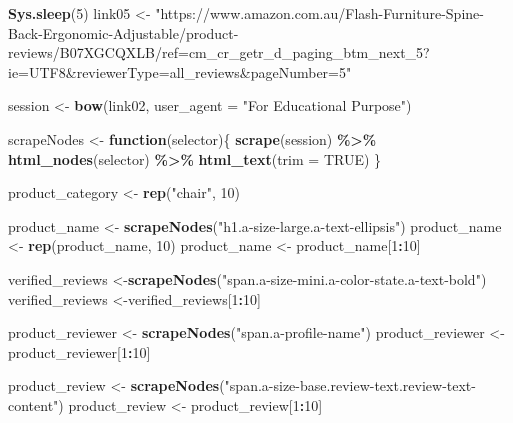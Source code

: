 \documentclass[
]{article}
\newenvironment{Shaded}{\begin{snugshade}}{\end{snugshade}}
\newcommand{\AttributeTok}[1]{\textcolor[rgb]{0.13,0.29,0.53}{#1}}
\newcommand{\ConstantTok}[1]{\textcolor[rgb]{0.56,0.35,0.01}{#1}}
\newcommand{\ControlFlowTok}[1]{\textcolor[rgb]{0.13,0.29,0.53}{\textbf{#1}}}
\newcommand{\DecValTok}[1]{\textcolor[rgb]{0.00,0.00,0.81}{#1}}
\newcommand{\FunctionTok}[1]{\textcolor[rgb]{0.13,0.29,0.53}{\textbf{#1}}}
\newcommand{\NormalTok}[1]{#1}
\newcommand{\OtherTok}[1]{\textcolor[rgb]{0.56,0.35,0.01}{#1}}
\newcommand{\SpecialCharTok}[1]{\textcolor[rgb]{0.81,0.36,0.00}{\textbf{#1}}}
\newcommand{\StringTok}[1]{\textcolor[rgb]{0.31,0.60,0.02}{#1}}
\begin{document}
\begin{Shaded}
\begin{Highlighting}[]
   \FunctionTok{Sys.sleep}\NormalTok{(}\DecValTok{5}\NormalTok{)}
\NormalTok{link05 }\OtherTok{\textless{}{-}} \StringTok{"https://www.amazon.com.au/Flash{-}Furniture{-}Spine{-}Back{-}Ergonomic{-}Adjustable/product{-}reviews/B07XGCQXLB/ref=cm\_cr\_getr\_d\_paging\_btm\_next\_5?ie=UTF8\&reviewerType=all\_reviews\&pageNumber=5"}


\NormalTok{  session }\OtherTok{\textless{}{-}} \FunctionTok{bow}\NormalTok{(link02,}
               \AttributeTok{user\_agent =} \StringTok{"For Educational Purpose"}\NormalTok{)}

\NormalTok{  scrapeNodes }\OtherTok{\textless{}{-}} \ControlFlowTok{function}\NormalTok{(selector)\{}
    \FunctionTok{scrape}\NormalTok{(session) }\SpecialCharTok{\%\textgreater{}\%}
      \FunctionTok{html\_nodes}\NormalTok{(selector) }\SpecialCharTok{\%\textgreater{}\%}
      \FunctionTok{html\_text}\NormalTok{(}\AttributeTok{trim =} \ConstantTok{TRUE}\NormalTok{)}
\NormalTok{  \}}

\NormalTok{  product\_category }\OtherTok{\textless{}{-}} \FunctionTok{rep}\NormalTok{(}\StringTok{"chair"}\NormalTok{, }\DecValTok{10}\NormalTok{)}

\NormalTok{  product\_name }\OtherTok{\textless{}{-}} \FunctionTok{scrapeNodes}\NormalTok{(}\StringTok{"h1.a{-}size{-}large.a{-}text{-}ellipsis"}\NormalTok{)}
\NormalTok{  product\_name }\OtherTok{\textless{}{-}} \FunctionTok{rep}\NormalTok{(product\_name, }\DecValTok{10}\NormalTok{)}
\NormalTok{  product\_name }\OtherTok{\textless{}{-}}\NormalTok{ product\_name[}\DecValTok{1}\SpecialCharTok{:}\DecValTok{10}\NormalTok{]}
  
\NormalTok{  verified\_reviews }\OtherTok{\textless{}{-}}\FunctionTok{scrapeNodes}\NormalTok{(}\StringTok{"span.a{-}size{-}mini.a{-}color{-}state.a{-}text{-}bold"}\NormalTok{)}
\NormalTok{  verified\_reviews }\OtherTok{\textless{}{-}}\NormalTok{verified\_reviews[}\DecValTok{1}\SpecialCharTok{:}\DecValTok{10}\NormalTok{]}
  
\NormalTok{  product\_reviewer }\OtherTok{\textless{}{-}} \FunctionTok{scrapeNodes}\NormalTok{(}\StringTok{"span.a{-}profile{-}name"}\NormalTok{)}
\NormalTok{  product\_reviewer }\OtherTok{\textless{}{-}}\NormalTok{ product\_reviewer[}\DecValTok{1}\SpecialCharTok{:}\DecValTok{10}\NormalTok{]}
  
\NormalTok{  product\_review }\OtherTok{\textless{}{-}} \FunctionTok{scrapeNodes}\NormalTok{(}\StringTok{"span.a{-}size{-}base.review{-}text.review{-}text{-}content"}\NormalTok{)}
\NormalTok{  product\_review }\OtherTok{\textless{}{-}}\NormalTok{ product\_review[}\DecValTok{1}\SpecialCharTok{:}\DecValTok{10}\NormalTok{]}
  

\end{Highlighting}
\end{Shaded}
\end{document}

